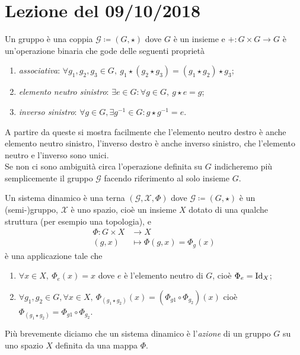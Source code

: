 \section{Lezione del 09/10/2018}
\begin{definition}[gruppo]
	Un gruppo è una coppia $ \mathcal{G} \coloneqq (G, \star) $ dove $ G $ è un insieme e $ + \colon G \times G \to G $ è un'operazione binaria che gode delle seguenti proprietà
	\begin{enumerate}[label=(\roman*)]
		\item \emph{associativa}: $ \forall g_1, g_2, g_3 \in G, \ g_1 \star (g_2 \star g_3) = (g_1 \star g_2) \star g_3 $;
		\item \emph{elemento neutro sinistro}: $  \exists e \in G : \forall g \in G, \ g \star e = g $;
		\item \emph{inverso sinistro}: $ \forall g \in G, \exists g^{-1} \in G : g \star g^{-1} = e $.
	\end{enumerate}
	A partire da queste si mostra facilmente che l'elemento neutro destro è anche elemento neutro sinistro, l'inverso destro è anche inverso sinistro, che l'elemento neutro e l'inverso sono unici. \\
	Se non ci sono ambiguità circa l'operazione definita su $ G $ indicheremo più semplicemente il gruppo $ \mathcal{G} $ facendo riferimento al solo insieme $ G $. 
\end{definition}

\begin{definition}
	Un sistema dinamico è una terna $ (\mathcal{G}, \mathcal{X}, \Phi) $ dove $ \mathcal{G} \coloneqq (G, \star) $ è un (semi-)gruppo, $ \mathcal{X} $ è uno spazio, cioè un insieme $ X $ dotato di una qualche struttura (per esempio una topologia), e 
	\begin{align*}
		\Phi \colon G \times X & \to X \\
		(g, x) & \mapsto \Phi(g, x) = \Phi_g(x)
	\end{align*}
	è una applicazione tale che
	\begin{enumerate}[label=(\roman*)]
		\item $ \forall x \in X, \ \Phi_e(x) = x $ dove $ e $ è l'elemento neutro di $ G $, cioè $ \Phi_e = \mathrm{Id}_X $;
		\item $ \forall g_1, g_2 \in G, \forall x \in X, \ \Phi_{(g_1 \star g_2)}(x) = (\Phi_{g1} \circ \Phi_{g_2})(x) $ cioè $ \Phi_{(g_1 \star g_2)} = \Phi_{g1} \circ \Phi_{g_2} $.
	\end{enumerate}
	Più brevemente diciamo che un sistema dinamico è l'\emph{azione} di un gruppo $ G $ su uno spazio $ X $ definita da una mappa $ \Phi $. 
\end{definition}


